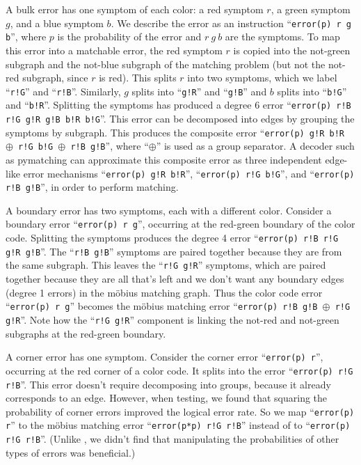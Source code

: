 \documentclass[onecolumn,unpublished,a4paper]{quantumarticle}
\theoremstyle{definition}
\theoremstyle{definition}
\theoremstyle{definition}
\begin{document}
A bulk error has one symptom of each color: a red symptom $r$, a green symptom $g$, and a blue symptom $b$.
We describe the error as an instruction ``\texttt{error(p) r g b}'', where $p$ is the probability of the error and $r\ g\ b$ are the symptoms.
To map this error into a matchable error, the red symptom $r$ is copied into the not-green subgraph and the not-blue subgraph of the matching problem (but not the not-red subgraph, since $r$ is red).
This splits $r$ into two symptoms, which we label ``\texttt{r!G}'' and ``\texttt{r!B}''.
Similarly, $g$ splits into ``\texttt{g!R}'' and ``\texttt{g!B}'' and $b$ splits into ``\texttt{b!G}'' and ``\texttt{b!R}''.
Splitting the symptoms has produced a degree 6 error ``\texttt{error(p) r!B r!G g!R g!B b!R b!G}''.
This error can be decomposed into edges by grouping the symptoms by subgraph.
This produces the composite error ``\texttt{error(p) g!R b!R   $\oplus$   r!G b!G   $\oplus$   r!B g!B}'', where ``$\oplus$'' is used as a group separator.
A decoder such as pymatching can approximate this composite error as three independent edge-like error mechanisms ``\texttt{error(p) g!R b!R}'', ``\texttt{error(p) r!G b!G}'', and ``\texttt{error(p) r!B g!B}'', in order to perform matching.

A boundary error has two symptoms, each with a different color.
Consider a boundary error ``\texttt{error(p) r g}'', occurring at the red-green boundary of the color code.
Splitting the symptoms produces the degree 4 error ``\texttt{error(p) r!B r!G g!R g!B}''.
The ``\texttt{r!B g!B}'' symptoms are paired together because they are from the same subgraph.
This leaves the ``\texttt{r!G g!R}'' symptoms, which are paired together because they are all that's left and we don't want any boundary edges (degree 1 errors) in the m{\"o}bius matching graph.
Thus the color code error ``\texttt{error(p) r g}'' becomes the m{\"o}bius matching error ``\texttt{error(p) r!B g!B $\oplus$ r!G g!R}''.
Note how the ``\texttt{r!G g!R}'' component is linking the not-red and not-green subgraphs at the red-green boundary.

A corner error has one symptom.
Consider the corner error ``\texttt{error(p) r}'', occurring at the red corner of a color code.
It splits into the error ``\texttt{error(p) r!G r!B}''.
This error doesn't require decomposing into groups, because it already corresponds to an edge.
However, when testing, we found that squaring the probability of corner errors improved the logical error rate.
So we map ``\texttt{error(p) r}'' to the m{\"o}bius matching error ``\texttt{error(p*p) r!G r!B}'' instead of to ``\texttt{error(p) r!G r!B}''.
(Unlike \cite{sahay2022mobiusdecoder}, we didn't find that manipulating the probabilities of other types of errors was beneficial.)
\end{document}

